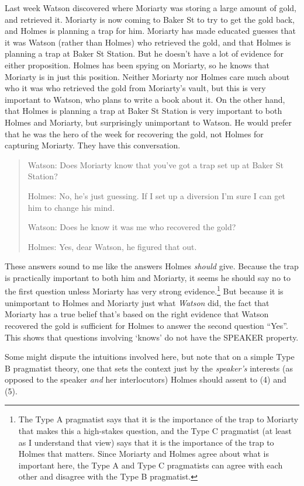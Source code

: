 \documentclass[
  11pt,
  letterpaper,
  DIV=11,
  numbers=noendperiod,
  twoside]{scrartcl}
\begin{document}
Last week Watson discovered where Moriarty was storing a large amount of
gold, and retrieved it. Moriarty is now coming to Baker St to try to get
the gold back, and Holmes is planning a trap for him. Moriarty has made
educated guesses that it was Watson (rather than Holmes) who retrieved
the gold, and that Holmes is planning a trap at Baker St Station. But he
doesn't have a lot of evidence for either proposition. Holmes has been
spying on Moriarty, so he knows that Moriarty is in just this position.
Neither Moriarty nor Holmes care much about who it was who retrieved the
gold from Moriarty's vault, but this is very important to Watson, who
plans to write a book about it. On the other hand, that Holmes is
planning a trap at Baker St Station is very important to both Holmes and
Moriarty, but surprisingly unimportant to Watson. He would prefer that
he was the hero of the week for recovering the gold, not Holmes for
capturing Moriarty. They have this conversation.

\begin{quote}
Watson: Does Moriarty know that you've got a trap set up at Baker St
Station?

Holmes: No, he's just guessing. If I set up a diversion I'm sure I can
get him to change his mind.

Watson: Does he know it was me who recovered the gold?

Holmes: Yes, dear Watson, he figured that out.
\end{quote}

These answers sound to me like the answers Holmes \emph{should} give.
Because the trap is practically important to both him and Moriarty, it
seems he should say no to the first question unless Moriarty has very
strong evidence.\footnote{The Type A pragmatist says that it is the
  importance of the trap to Moriarty that makes this a high-stakes
  question, and the Type C pragmatist (at least as I understand that
  view) says that it is the importance of the trap to Holmes that
  matters. Since Moriarty and Holmes agree about what is important here,
  the Type A and Type C pragmatists can agree with each other and
  disagree with the Type B pragmatist.} But because it is unimportant to
Holmes and Moriarty just what \emph{Watson} did, the fact that Moriarty
has a true belief that's based on the right evidence that Watson
recovered the gold is sufficient for Holmes to answer the second
question ``Yes''. This shows that questions involving `knows' do not
have the SPEAKER property.

Some might dispute the intuitions involved here, but note that on a
simple Type B pragmatist theory, one that sets the context just by the
\emph{speaker's} interests (as opposed to the speaker \emph{and} her
interlocutors) Holmes should assent to (4) and (5).
\end{document}
